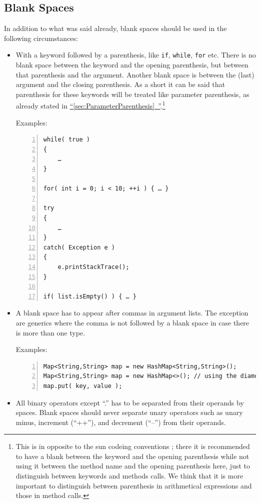 \documentclass[11pt,a4paper, titlepage, parskip=half, headsepline, footsepline, cleardoublepage=current, headheight=1cm]{scrbook}
\newcommand*{\tqfullref}[1]{\hyperref[{#1}]{“\ref*{#1}~\nameref*{#1}”}}
\begin{document}
\subsection{Blank Spaces}\label{sec:BlankSpaces}
In addition to what was said already, blank spaces should be used in the following circumstances:
\begin{itemize}
\item{With a keyword followed by a parenthesis, like \lstinline|if|, \lstinline|while|, \lstinline|for| etc. There is no blank space between the keyword and the opening parenthesis, but  between that parenthesis and the argument. Another blank space is between the (last) argument and the closing parenthesis. As a short it can be said that parenthesis for these keywords will be treated like parameter parenthesis, as already stated in \tqfullref{sec:ParameterParenthesis}.\footnote{This is in opposite to the sun codeing conventions \autocite{SUN_CODE_CONVENTIONS}; there it is recommended to have a blank between the keyword and the opening parenthesis while not using it between the method name and the opening parenthesis here, just to distinguish between keywords and methods calls. We think that it is more important to distinguish between parenthesis in arithmetical expressions and those in method calls.}

Examples:
\begin{lstlisting}[numbers=left]
while( true )
{
    …
}

for( int i = 0; i < 10; ++i ) { … }

try
{
    …
}
catch( Exception e )
{
    e.printStackTrace();
}

if( list.isEmpty() ) { … }
\end{lstlisting}}
\item{A blank space has to appear after commas in argument lists. The exception are generics where the comma is not followed by a blank space in case there is more than one type.

Examples:
\begin{lstlisting}[numbers=left]
Map<String,String> map = new HashMap<String,String>();
Map<String,String> map = new HashMap<>(); // using the diamond operator
map.put( key, value );
\end{lstlisting}}
\item{All binary operators except “.” has to be separated from their operands by spaces. Blank spaces should never separate unary operators such as unary minus, increment (“++”), and decrement (“--”) from their operands.

}
\end{itemize}
\end{document}
